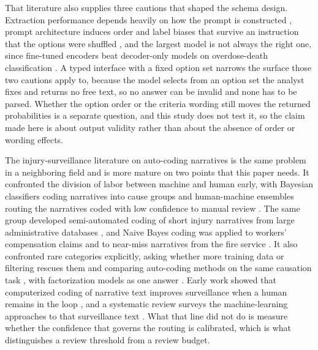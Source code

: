 That literature also supplies three cautions that shaped the schema design. Extraction performance depends heavily on how
the prompt is constructed \citep{wu2026automated}, prompt architecture induces order and
label biases that survive an instruction that the options were shuffled
\citep{brucks2025prompt}, and the largest model is not always the right one, since
fine-tuned encoders beat decoder-only models on overdose-death classification
\citep{funnell2026improving}. A typed interface with a fixed option set narrows the surface those two cautions apply to,
because the model selects from an option set the analyst fixes and returns no free text, so no
answer can be invalid and none has to be parsed. Whether the option order or the criteria
wording still moves the returned probabilities is a separate question, and this study does not
test it, so the claim made here is about output validity rather than about the absence of
order or wording effects.

The injury-surveillance literature on auto-coding narratives is the same problem in a
neighboring field and is more mature on two points that this paper needs. It confronted the division of labor between machine and human early, with Bayesian classifiers coding narratives into cause groups \citep{lehto2009bayesian} and human-machine ensembles routing the narratives coded with low confidence to manual review \citep{marucciwellm2017classifyin}. The same group developed
semi-automated coding of short injury narratives from large administrative databases
\citep{marucciwellman2015practical}, and Naive Bayes coding was applied to workers'
compensation claims and to near-miss narratives from the fire service
\citep{bertke2012naive,taylor2014nearmiss}. It also confronted rare categories
explicitly, asking whether more training data or filtering rescues them
\citep{nanda2018improving} and comparing auto-coding methods on the same causation task
\citep{bertke2016comparison}, with factorization models as one answer
\citep{chen2015factorization}. Early work showed that computerized coding of narrative text improves surveillance when a
human remains in the loop \citep{wellman2004computerized}, and a systematic review surveys the machine-learning approaches to that surveillance text \citep{vallmuur2015review}. What that line did not do is measure
whether the confidence that governs the routing is calibrated, which is what distinguishes
a review threshold from a review budget.

